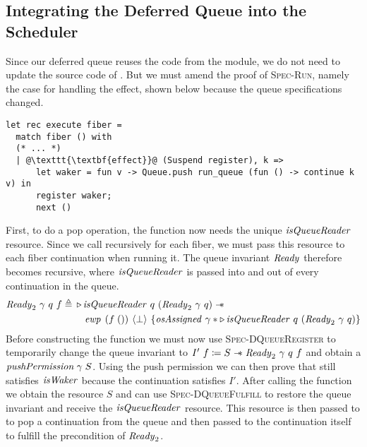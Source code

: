 
\subsection{Integrating the Deferred Queue into the Scheduler}
Since our deferred queue reuses the code from the  module, we do not need to update the source code of .
But we must amend the proof of \textsc{Spec-Run}, namely the case for handling the \esuspend{} effect, shown below because the queue specifications changed.
\begin{verbatim}
let rec execute fiber = 
  match fiber () with
  (* ... *)
  | @\texttt{\textbf{effect}}@ (Suspend register), k =>
      let waker = fun v -> Queue.push run_queue (fun () -> continue k v) in
      register waker;
      next ()
\end{verbatim}
First, to do a pop operation, the  function now needs the unique \(\mathit{isQueueReader}{}\) resource.
Since we call  recursively for each fiber, we must pass this resource to each fiber continuation when running it.
The queue invariant \(\mathit{Ready}{}\) therefore becomes recursive, where \(\mathit{isQueueReader}{}\) is passed into and out of every continuation in the queue.
\begin{align*}
  \gsReady{2}~\gamma~q~f \triangleq\; & \later \gsIsQueueReader{}~q~(\gsReady{2}~\gamma~q) \wand                                                \\
                                      & \myquad[1] \ewp{f\; ()}{\bot}{\gspdone{\gamma} \ast \later \gsIsQueueReader{}~q~(\gsReady{2}~\gamma~q)}
\end{align*}
Before constructing the  function we must now use \textsc{Spec-DQueueRegister} to temporarily change the queue invariant to \(I'~f \coloneq S \mathrel{-\!\!\ast} \mathit{Ready}_{2}~\gamma~q~f\) and obtain a \(\mathit{pushPermission}{}\; \gamma\; S\).
Using the push permission  we can then prove that  still satisfies \(\mathit{isWaker}{}\) because the continuation  satisfies \(I'\).
After calling the  function we obtain the resource \(S\) and can use \textsc{Spec-DQueueFulfill} to restore the queue invariant and receive the \(\mathit{isQueueReader}{}\) resource.
This resource is then passed to  to pop a continuation from the queue and then passed to the continuation itself to fulfill the precondition of \(\mathit{Ready}_{2}\).
% 
